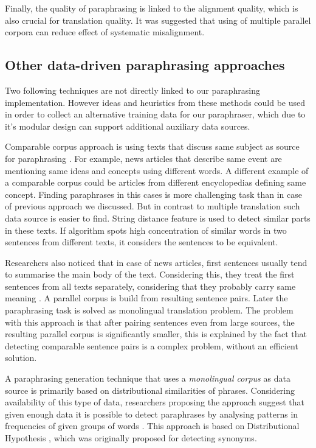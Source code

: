 Finally, the quality of paraphrasing is linked to the alignment quality, which is also crucial for translation quality. It was suggested that using of multiple parallel corpora can reduce effect of systematic misalignment.

\subsection{Other data-driven paraphrasing approaches}

Two following techniques are not directly linked to our paraphrasing implementation. However ideas and heuristics from these methods could be used in order to collect an alternative training data for our paraphraser, which due to it's modular design can support additional auxiliary data sources.  

Comparable corpus approach is using texts that discuss same subject as source for paraphrasing \citep{dolan2004unsupervised,dolan2005automatically}. For example, news articles that describe same event are mentioning same ideas and concepts using different words. A different example of a comparable corpus could be articles from different encyclopedias defining same concept. Finding paraphrases in this cases is more challenging task than in case of previous approach we discussed. But in contrast to multiple translation such data source is easier to find. String distance feature is used to detect similar parts in these texts. If algorithm spots high concentration of similar words in two sentences from different texts, it considers the sentences to be equivalent. 

Researchers also noticed that in case of news articles, first sentences usually tend to summarise the main body of the text. Considering this, they treat the first sentences from all texts separately, considering that they probably carry same meaning \citep{dolan2005automatically}. A parallel corpus is build from resulting sentence pairs. Later the paraphrasing task is solved as monolingual translation problem. The problem with this approach is that after pairing sentences even from large sources, the resulting parallel corpus is significantly smaller, this is explained by the fact that detecting comparable sentence pairs is a complex problem, without an efficient solution.

A paraphrasing generation technique that uses a \textit{monolingual corpus} as data source is primarily based on distributional similarities of phrases. Considering availability of this type of data, researchers proposing the approach suggest that given enough data it is possible to detect paraphrases by analysing patterns in frequencies of given groups of words \citep{lin2001dirt}. This approach is based on Distributional Hypothesis \citep{harris1954distributional}, which was originally proposed for detecting synonyms.


